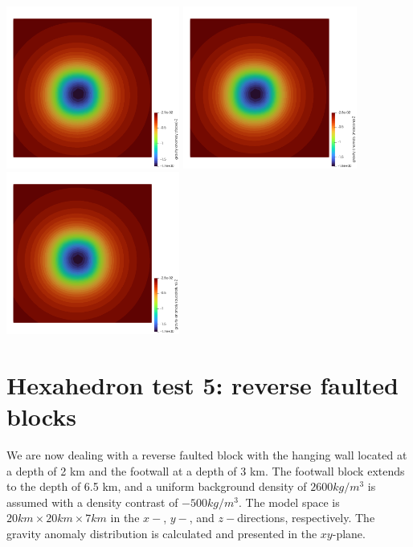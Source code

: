 \begin{center}
\includegraphics[width=5.7cm]{python_codes/fieldstone_113/results/hex_test4/g_faces}
\includegraphics[width=5.7cm]{python_codes/fieldstone_113/results/hex_test4/g_mascons}
\includegraphics[width=5.7cm]{python_codes/fieldstone_113/results/hex_test4/g_quad}
\end{center}


\section*{Hexahedron test 5: reverse faulted blocks}

We are now dealing with a reverse faulted block with the
hanging wall located at a depth of 2 km and the footwall at a depth
of 3 km. The footwall block extends to the depth of 6.5 km, and a
uniform background density of $2600 kg/m^3$ is assumed with a
density contrast of $-500 kg/m^3$. The model space is 
$20 km \times  20 km \times 7 km$ 
in the $x-$, $y-$, and $z-$directions, respectively. 
The gravity anomaly distribution is calculated and presented in the $xy$-plane.


